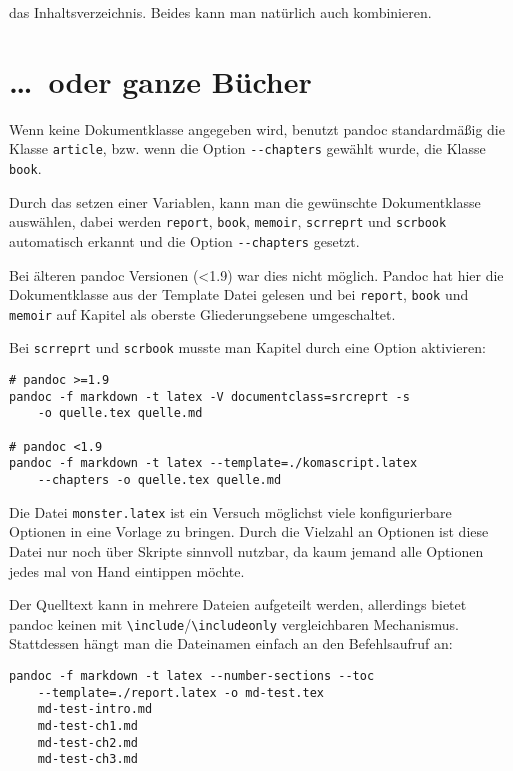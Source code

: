 \documentclass[11pt,ngerman,a4paper]{article}
\begin{document}
das Inhaltsverzeichnis. Beides kann man natürlich auch kombinieren.

\section{\ldots{}~oder ganze Bücher}

Wenn keine Dokumentklasse angegeben wird, benutzt pandoc standardmäßig
die Klasse \texttt{article}, bzw. wenn die Option \texttt{-{}-chapters}
gewählt wurde, die Klasse \texttt{book}.

Durch das setzen einer Variablen, kann man die gewünschte Dokumentklasse
auswählen, dabei werden \texttt{report}, \texttt{book}, \texttt{memoir},
\texttt{scrreprt} und \texttt{scrbook} automatisch erkannt und die
Option \texttt{-{}-chapters} gesetzt.

Bei älteren pandoc Versionen (\textless{}1.9) war dies nicht möglich.
Pandoc hat hier die Dokumentklasse aus der Template Datei gelesen und
bei \texttt{report}, \texttt{book} und \texttt{memoir} auf Kapitel als
oberste Gliederungsebene umgeschaltet.

Bei \texttt{scrreprt} und \texttt{scrbook} musste man Kapitel durch eine
Option aktivieren:

\begin{verbatim}
# pandoc >=1.9
pandoc -f markdown -t latex -V documentclass=srcreprt -s
    -o quelle.tex quelle.md

# pandoc <1.9
pandoc -f markdown -t latex --template=./komascript.latex 
    --chapters -o quelle.tex quelle.md
\end{verbatim}

Die Datei \texttt{monster.latex} ist ein Versuch möglichst viele
konfigurierbare Optionen in eine Vorlage zu bringen. Durch die Vielzahl
an Optionen ist diese Datei nur noch über Skripte sinnvoll nutzbar, da
kaum jemand alle Optionen jedes mal von Hand eintippen möchte.

Der Quelltext kann in mehrere Dateien aufgeteilt werden, allerdings
bietet pandoc keinen mit
\texttt{\textbackslash{}include}/\texttt{\textbackslash{}includeonly}
vergleichbaren Mechanismus. Stattdessen hängt man die Dateinamen einfach
an den Befehlsaufruf an:

\begin{verbatim}
pandoc -f markdown -t latex --number-sections --toc 
    --template=./report.latex -o md-test.tex 
    md-test-intro.md 
    md-test-ch1.md 
    md-test-ch2.md 
    md-test-ch3.md
\end{verbatim}
\end{document}
